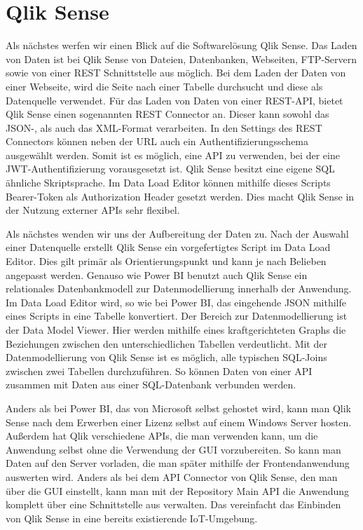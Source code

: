 \section{Qlik Sense}
\label{sec:qliksense}
Als nächstes werfen wir einen Blick auf die Softwarelösung Qlik Sense.
Das Laden von Daten ist bei Qlik Sense von Dateien, Datenbanken, Webseiten, FTP-Servern sowie von einer
REST Schnittstelle aus möglich. Bei dem Laden der Daten von einer Webseite, wird die Seite nach einer Tabelle
durchsucht und diese als Datenquelle verwendet.\cite[S. 17]{QlikSenseCookbook} Für das Laden von Daten von
einer REST-API, bietet Qlik Sense einen sogenannten REST Connector an. Dieser kann sowohl das \mbox{JSON-,} als auch
das XML-Format verarbeiten. In den Settings des REST Connectors können neben der URL auch ein
Authentifizierungsschema ausgewählt werden.\cite[S. 23]{QlikSenseCookbook} Somit ist es möglich,
eine API zu verwenden, bei der eine JWT-Authentifizierung vorausgesetzt ist. Qlik Sense besitzt
eine eigene SQL ähnliche Skriptsprache. Im Data Load Editor
können mithilfe dieses Scripts Bearer-Token als Authorization Header gesetzt werden. Dies macht Qlik
Sense in der Nutzung externer APIs sehr flexibel.

Als nächstes wenden wir uns der Aufbereitung der Daten zu. Nach der Auswahl einer Datenquelle
erstellt Qlik Sense ein vorgefertigtes Script im Data Load Editor. Dies gilt primär als Orientierungspunkt
und kann je nach Belieben angepasst werden. Genauso wie Power BI benutzt auch Qlik Sense ein relationales
Datenbankmodell zur Datenmodellierung innerhalb der Anwendung. Im Data Load Editor
wird, so wie bei Power BI, das eingehende JSON mithilfe eines Scripts in eine Tabelle konvertiert.
Der Bereich zur Datenmodellierung ist der Data Model Viewer.
Hier werden mithilfe eines kraftgerichteten Graphs die Beziehungen zwischen den unterschiedlichen
Tabellen verdeutlicht. Mit der Datenmodellierung von Qlik Sense ist es möglich, alle typischen SQL-Joins
zwischen zwei Tabellen durchzuführen. So können Daten von einer API zusammen mit Daten aus einer SQL-Datenbank
verbunden werden.

Anders als bei Power BI, das von Microsoft selbst gehostet wird, kann man Qlik Sense nach dem Erwerben
einer Lizenz selbst auf einem Windows Server hosten. Außerdem hat Qlik verschiedene APIs, die man
verwenden kann, um die Anwendung selbst ohne die Verwendung der GUI vorzubereiten. So kann man Daten
auf den Server vorladen, die man später mithilfe der Frontendanwendung auswerten wird. Anders als bei
dem API Connector von Qlik Sense, den man über die GUI einstellt, kann man mit der Repository Main API
die Anwendung komplett über eine Schnittstelle aus verwalten.\cite{QlikSenseRepositoryMainAPI}
Das vereinfacht das Einbinden von Qlik Sense in eine bereits existierende IoT-Umgebung.

